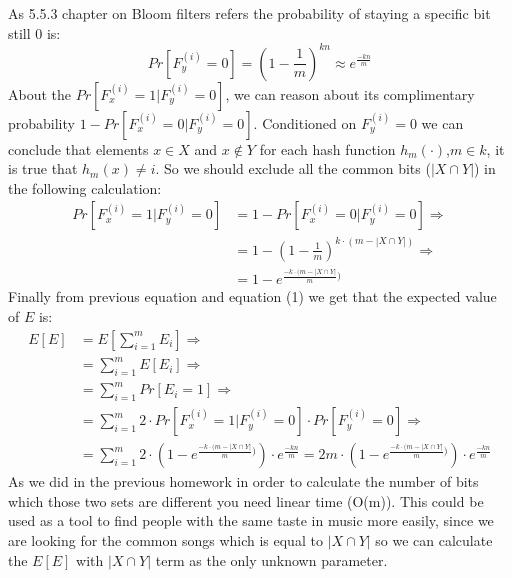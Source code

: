 \documentclass[11pt]{537homework}
\begin{document}
As 5.5.3 chapter on Bloom filters refers the probability of staying a specific bit still 0 is:
\begin{equation}
    Pr[F_y^{(i)} = 0] = (1-\frac{1}{m})^{kn} \approx e^{\frac{-kn}{m}}
\end{equation}
About the $Pr[F_x^{(i)} = 1 | F_y^{(i)} = 0]$, we can reason about its complimentary probability $1 - Pr[F_x^{(i)} = 0 | F_y^{(i)} = 0]$. Conditioned on $F_y^{(i)} = 0$ we can conclude that elements $x\in X$ and $x \notin Y$ for each hash function $h_m(\cdot)$,$m\in k$, it is true that $h_m(x) \neq i$. So we should exclude all the common bits ($|X \cap Y|$) in the following calculation:
\begin{align*}
    Pr[F_x^{(i)} = 1 | F_y^{(i)} = 0] &= 1 - Pr[F_x^{(i)} = 0 | F_y^{(i)} = 0] \Longrightarrow \\
    &= 1 - (1-\frac{1}{m})^{k \cdot (m - |X \cap Y|)} \Longrightarrow \\
    &= 1 - e^{\frac{-k \cdot (m - |X \cap Y|}{m})}
\end{align*}
Finally from previous equation and equation (1) we get that the expected value of $E$ is:
\begin{align*}
    E[E] &= E[\sum_{i=1}^{m} E_i] \Longrightarrow \\
         &= \sum_{i=1}^{m} E[E_i] \Longrightarrow \\
         &= \sum_{i=1}^{m} Pr[E_i = 1] \Longrightarrow \\
         &= \sum_{i=1}^{m} 2 \cdot Pr[F_x^{(i)} = 1 | F_y^{(i)} = 0] \cdot Pr[F_y^{(i)} = 0] \Longrightarrow \\
         &= \sum_{i=1}^{m} 2 \cdot (1 - e^{\frac{-k \cdot (m - |X \cap Y|}{m})}) \cdot e^{\frac{-kn}{m}} =  2m \cdot (1 - e^{\frac{-k \cdot (m - |X \cap Y|}{m})}) \cdot e^{\frac{-kn}{m}} 
\end{align*}
As we did in the previous homework in order to calculate the number of bits which those two sets are different you need linear time (O(m)). This could be used as a tool to find people with the same taste in music more easily, since we are looking for the common songs which is equal to $|X \cap Y|$ so we can calculate the $E[E]$ with $|X \cap Y|$ term as the only unknown parameter. 
\end{document}
